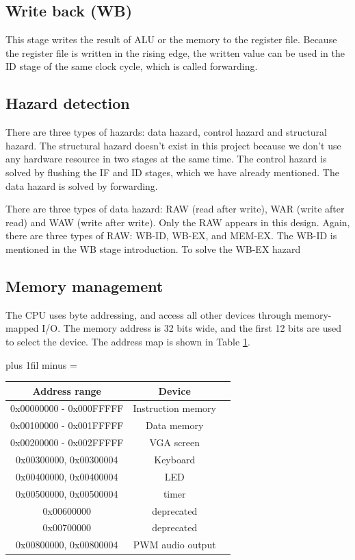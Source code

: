 \documentclass[
	a4paper, %
	11pt, %
]{CSUniSchoolLabReport}
\def\Scentering{\leftskip=0pt plus 1fil minus \Rmargin
                \rightskip=\leftskip}
\begin{document}
\subsection*{Write back (WB)}
This stage writes the result of ALU or the memory to the register file. Because the register file is written in the rising edge, the written value can be used in the ID stage of the same clock cycle, which is called forwarding.

\subsection{Hazard detection}
There are three types of hazards: data hazard, control hazard and structural hazard. The structural hazard doesn't exist in this project because we don't use any hardware resource in two stages at the same time. The control hazard is solved by flushing the IF and ID stages, which we have already mentioned. The data hazard is solved by forwarding.

There are three types of data hazard: RAW (read after write), WAR (write after read) and WAW (write after write). Only the RAW appears in this design. Again, there are three types of RAW: WB-ID, WB-EX, and MEM-EX. The WB-ID is mentioned in the WB stage introduction. To solve the WB-EX hazard

\subsection{Memory management}

The CPU uses byte addressing, and access all other devices through memory-mapped I/O. The memory address is 32 bits wide, and the first 12 bits are used to select the device. The address map is shown in Table \ref{tab:address-map}.
\begin{table}[h]
    \Scentering
    \begin{tabular}{|c|c|c|}
        \hline
        Address range           & Device             \\
        \hline
        0x00000000 - 0x000FFFFF & Instruction memory \\
        \hline
        0x00100000 - 0x001FFFFF & Data memory        \\
        \hline
        0x00200000 - 0x002FFFFF & VGA screen         \\
        \hline
        0x00300000, 0x00300004  & Keyboard           \\
        \hline
        0x00400000, 0x00400004  & LED                \\
        \hline
        0x00500000, 0x00500004  & timer              \\
        \hline
        0x00600000              & deprecated         \\
        \hline
        0x00700000              & deprecated         \\
        \hline
        0x00800000, 0x00800004  & PWM audio output   \\
        \hline
    \end{tabular}
    \label{tab:address-map}
\end{table}
\end{document}
